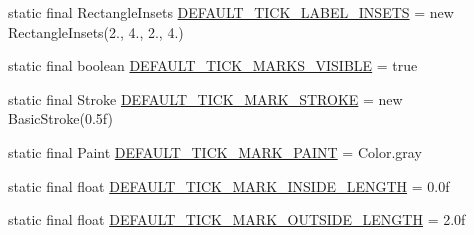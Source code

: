 \begin{DoxyCompactItemize}
static final Rectangle\+Insets \mbox{\hyperlink{classorg_1_1jfree_1_1chart_1_1axis_1_1_axis_aa439ad451c367bbb6ebffd7e4579d3c2}{D\+E\+F\+A\+U\+L\+T\+\_\+\+T\+I\+C\+K\+\_\+\+L\+A\+B\+E\+L\+\_\+\+I\+N\+S\+E\+TS}} = new Rectangle\+Insets(2., 4., 2., 4.)
\item 
static final boolean \mbox{\hyperlink{classorg_1_1jfree_1_1chart_1_1axis_1_1_axis_ab2ae67275368429d435341df7b13db4e}{D\+E\+F\+A\+U\+L\+T\+\_\+\+T\+I\+C\+K\+\_\+\+M\+A\+R\+K\+S\+\_\+\+V\+I\+S\+I\+B\+LE}} = true
\item 
static final Stroke \mbox{\hyperlink{classorg_1_1jfree_1_1chart_1_1axis_1_1_axis_ab42656c095e07e61982d92e60656fcbc}{D\+E\+F\+A\+U\+L\+T\+\_\+\+T\+I\+C\+K\+\_\+\+M\+A\+R\+K\+\_\+\+S\+T\+R\+O\+KE}} = new Basic\+Stroke(0.\+5f)
\item 
static final Paint \mbox{\hyperlink{classorg_1_1jfree_1_1chart_1_1axis_1_1_axis_ad7d616085fb7f69dd6fa8deab2aa919d}{D\+E\+F\+A\+U\+L\+T\+\_\+\+T\+I\+C\+K\+\_\+\+M\+A\+R\+K\+\_\+\+P\+A\+I\+NT}} = Color.\+gray
\item 
static final float \mbox{\hyperlink{classorg_1_1jfree_1_1chart_1_1axis_1_1_axis_a8d4e03f91a32723717c7f687d9c69e27}{D\+E\+F\+A\+U\+L\+T\+\_\+\+T\+I\+C\+K\+\_\+\+M\+A\+R\+K\+\_\+\+I\+N\+S\+I\+D\+E\+\_\+\+L\+E\+N\+G\+TH}} = 0.\+0f
\item 
static final float \mbox{\hyperlink{classorg_1_1jfree_1_1chart_1_1axis_1_1_axis_a65344d44d3d79ffbdd465b09e220d93b}{D\+E\+F\+A\+U\+L\+T\+\_\+\+T\+I\+C\+K\+\_\+\+M\+A\+R\+K\+\_\+\+O\+U\+T\+S\+I\+D\+E\+\_\+\+L\+E\+N\+G\+TH}} = 2.\+0f
\end{DoxyCompactItemize}
